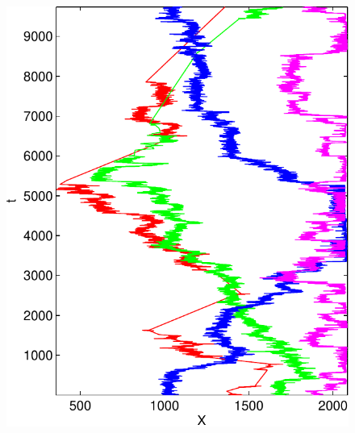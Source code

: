 \documentclass[12pt]{article}
\begin{document}
\begin{figure}
\begin{center}
{  \includegraphics[height=.3\textheight]{testdata_trajs}
  \label{fig:testdata_trajs}
}\hspace{1em}
\subfigure[]{
}
\end{center}
\end{figure}
\end{document}
